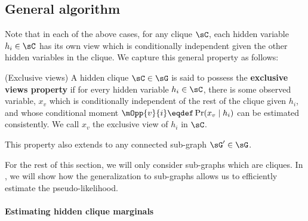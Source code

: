 \subsection{General algorithm}
\label{sec:directedGeneral}

Note that in each of the above cases,
  for any clique $\sC$, each hidden variable $h_i \in \sC$ has its own
  view which is conditionally independent given the other hidden variables in
  the clique.
We capture this general property as follows:
\begin{property}(Exclusive views)
  \label{prop:exclusive-views}
A hidden clique $\sC \in \sG$ is said to possess the \textbf{exclusive views property} if for
  every hidden variable $h_i \in \sC$, there is some observed variable,
  $x_{v}$ which is conditionally independent of the rest of the clique
  given $h_i$, and whose conditional moment $\mOpp{v}{i} \eqdef
  \Pr(x_{v} \mid h_i)$ can be estimated consistently.
We call $x_v$ the exclusive view of $h_i$ in $\sC$.

This property also extends to any connected sub-graph $\sG' \in \sG$.
\end{property}

For the rest of this section, we will only consider sub-graphs which are
  cliques. 
In , we will show how the generalization
  to sub-graphs allows us to efficiently estimate the pseudo-likelihood.


\paragraph{Estimating hidden clique marginals}

